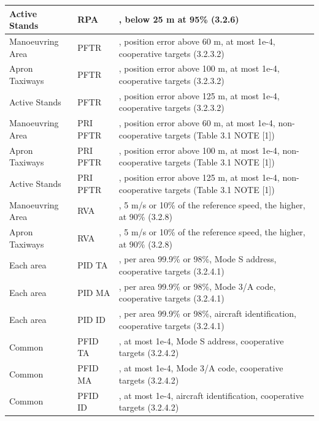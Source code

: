 \begin{center}
\begin{table}[H]
\begin{tabularx}{\textwidth}{ | l | l | X | }
    Active Stands & RPA & \nameref{sec:eval_req_pos_distance}, below 25 m at 95\% (3.2.6) \\ \hline
    Manoeuvring Area & PFTR & \nameref{sec:eval_req_pos_distance}, position error above 60 m, at most 1e-4, cooperative targets (3.2.3.2) \\ \hline
    Apron Taxiways & PFTR & \nameref{sec:eval_req_pos_distance}, position error above 100 m, at most 1e-4, cooperative targets (3.2.3.2) \\ \hline
    Active Stands & PFTR & \nameref{sec:eval_req_pos_distance}, position error above 125 m, at most 1e-4, cooperative targets (3.2.3.2) \\ \hline
    Manoeuvring Area & PRI PFTR & \nameref{sec:eval_req_pos_distance}, position error above 60 m, at most 1e-4, non-cooperative targets (Table 3.1 NOTE [1]) \\ \hline
    Apron Taxiways & PRI PFTR & \nameref{sec:eval_req_pos_distance}, position error above 100 m, at most 1e-4, non-cooperative targets (Table 3.1 NOTE [1]) \\ \hline
    Active Stands & PRI PFTR & \nameref{sec:eval_req_pos_distance}, position error above 125 m, at most 1e-4, non-cooperative targets (Table 3.1 NOTE [1]) \\ \hline
    Manoeuvring Area & RVA & \nameref{sec:eval_req_speed}, 5 m/s or 10\% of the reference speed, the higher, at 90\% (3.2.8) \\ \hline
    Apron Taxiways & RVA & \nameref{sec:eval_req_speed}, 5 m/s or 10\% of the reference speed, the higher, at 90\% (3.2.8) \\ \hline
    Each area & PID TA & \nameref{sec:eval_req_id_correct}, per area 99.9\% or 98\%, Mode S address, cooperative targets (3.2.4.1) \\ \hline
    Each area & PID MA & \nameref{sec:eval_req_id_correct}, per area 99.9\% or 98\%, Mode 3/A code, cooperative targets (3.2.4.1) \\ \hline
    Each area & PID ID & \nameref{sec:eval_req_id_correct}, per area 99.9\% or 98\%, aircraft identification, cooperative targets (3.2.4.1) \\ \hline
    Common & PFID TA & \nameref{sec:eval_req_id_false}, at most 1e-4, Mode S address, cooperative targets (3.2.4.2) \\ \hline
    Common & PFID MA & \nameref{sec:eval_req_id_false}, at most 1e-4, Mode 3/A code, cooperative targets (3.2.4.2) \\ \hline
    Common & PFID ID & \nameref{sec:eval_req_id_false}, at most 1e-4, aircraft identification, cooperative targets (3.2.4.2) \\ \hline
\end{tabularx}
\end{table}
\end{center}
\ \\

